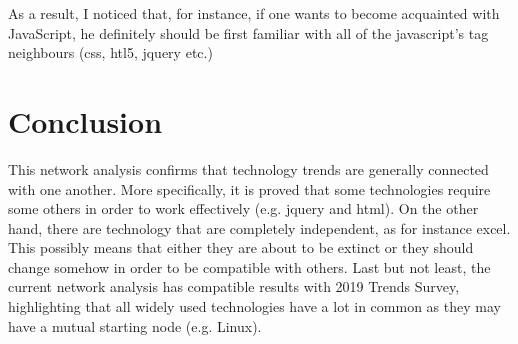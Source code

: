 \documentclass[12pt]{article}
\begin{document}
		\FloatBarrier
		As a result, I noticed that, for instance,  if one wants to become acquainted with JavaScript, he definitely should be first familiar with all of the javascript's tag neighbours (css, htl5, jquery etc.)
		
	\section{Conclusion}
		This network analysis confirms that technology trends are generally connected with one another. More specifically, it is proved that some technologies require some others in order to work effectively (e.g. jquery and html).
		On the other hand, there are technology that are completely independent, as for instance excel. This possibly means that either they are about to be extinct or they should change somehow in order to be compatible with others. 
		Last but not least, the current network analysis has compatible results with 2019 Trends Survey, highlighting that all widely used technologies have a lot in common as they may have a mutual starting node (e.g. Linux).
\end{document}
